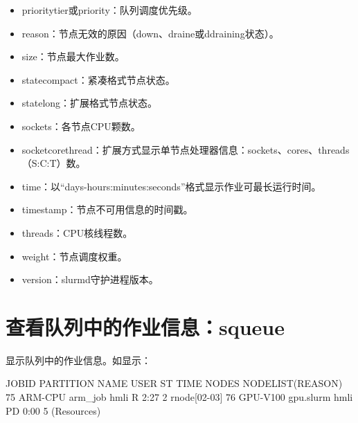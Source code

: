 \begin{itemize}
\begin{itemize}
\begin{itemize}
   	\item prioritytier或priority：队列调度优先级。
   	\item reason：节点无效的原因（down、draine或ddraining状态）。
   	\item size：节点最大作业数。
   	\item statecompact：紧凑格式节点状态。
   	\item statelong：扩展格式节点状态。
   	\item sockets：各节点CPU颗数。
   	\item socketcorethread：扩展方式显示单节点处理器信息：sockets、cores、threads（S:C:T）数。
   	\item time：以``days-hours:minutes:seconds''格式显示作业可最长运行时间。
   	\item timestamp：节点不可用信息的时间戳。
   	\item threads：CPU核线程数。
   	\item weight：节点调度权重。
   	\item version：slurmd守护进程版本。
\end{itemize}
\end{itemize}
\end{itemize}

\section{查看队列中的作业信息：squeue}
显示队列中的作业信息。如显示：
\begin{OUT}
JOBID PARTITION      NAME     USER ST       TIME  NODES NODELIST(REASON)
   75   ARM-CPU   arm_job     hmli  R       2:27      2 rnode[02-03]
   76  GPU-V100 gpu.slurm     hmli PD       0:00      5 (Resources)
\end{OUT}

